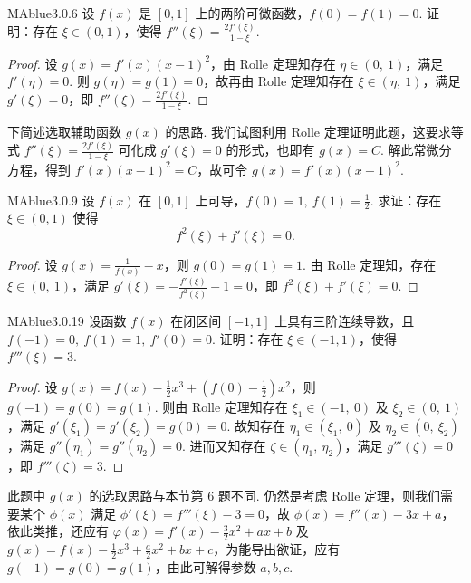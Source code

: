 \begin{problem}{MAblue}{3.0.6}
    设 $f(x)$ 是 $[0, 1]$ 上的两阶可微函数，$f(0) = f(1) = 0$. 证明：存在 $\xi \in (0, 1)$，使得 $f''(\xi) = \frac{2f'(\xi)}{1-\xi}$.
\end{problem}

\begin{proof}
    设 $g(x) = f'(x)(x-1)^2$，由 Rolle 定理知存在 $\eta \in (0,\ 1)$，满足 $f'(\eta) = 0$. 则 $g(\eta) = g(1) = 0$，故再由 Rolle 定理知存在 $\xi \in (\eta,\ 1)$，满足 $g'(\xi) = 0$，即 $f''(\xi) = \frac{2f'(\xi)}{1-\xi}$.
\end{proof}

\begin{mnote}
    下简述选取辅助函数 $g(x)$ 的思路. 我们试图利用 Rolle 定理证明此题，这要求等式 $f''(\xi) = \frac{2f'(\xi)}{1-\xi}$ 可化成 $g'(\xi) = 0$ 的形式，也即有 $g(x) = C$. 解此常微分方程，得到 $f'(x)(x-1)^2 = C$，故可令 $g(x) = f'(x)(x-1)^2$.
\end{mnote}

\begin{problem}{MAblue}{3.0.9}
    设 $f(x)$ 在 $[0, 1]$ 上可导，$f(0) = 1,\ f(1) = \frac 1 2$. 求证：存在 $\xi \in (0, 1)$ 使得
    \[
        f^2(\xi) + f'(\xi) = 0.
    \]
\end{problem}

\begin{proof}
    设 $g(x) = \frac 1 {f(x)} - x$，则 $g(0) = g(1) = 1$. 由 Rolle 定理知，存在 $\xi \in (0,\ 1)$，满足 $g'(\xi) = - \frac{f'(\xi)}{f^2(\xi)} - 1 = 0$，即 $f^2(\xi) + f'(\xi) = 0$.
\end{proof}

\begin{problem}{MAblue}{3.0.19}
    设函数 $f(x)$ 在闭区间 $[-1, 1]$ 上具有三阶连续导数，且 $f(-1) = 0,\ f(1) = 1,\ f'(0) = 0$. 证明：存在 $\xi \in (-1, 1)$，使得 $f'''(\xi) = 3$.
\end{problem}

\begin{proof}
    设 $g(x) = f(x) - \frac 1 2 x^3 + \left( f(0) - \frac 1 2 \right) x^2$，则 $g(-1) = g(0) = g(1)$. 则由 Rolle 定理知存在 $\xi_1 \in (-1,\ 0)$ 及 $\xi_2 \in (0,\ 1)$，满足 $g'(\xi_1) = g'(\xi_2) = g(0) = 0$. 故知存在 $\eta_1 \in (\xi_1,\ 0)$ 及 $\eta_2 \in (0,\ \xi_2)$，满足 $g''(\eta_1) = g''(\eta_2) = 0$. 进而又知存在 $\zeta \in (\eta_1,\ \eta_2)$，满足 $g'''(\zeta) = 0$，即 $f'''(\zeta) = 3$.
\end{proof}

\begin{mnote}
    此题中 $g(x)$ 的选取思路与本节第 6 题不同. 仍然是考虑 Rolle 定理，则我们需要某个 $\phi(x)$ 满足 $\phi'(\xi) = f'''(\xi) - 3 = 0$，故 $\phi(x) = f''(x) - 3x + a$，依此类推，还应有 $\varphi(x) = f'(x) - \frac 3 2 x^2 + ax + b$ 及 $g(x) = f(x) - \frac 1 2 x^3 + \frac a 2 x^2 + bx + c$，为能导出欲证，应有 $g(-1) = g(0) = g(1)$，由此可解得参数 $a, b, c$.
\end{mnote}

